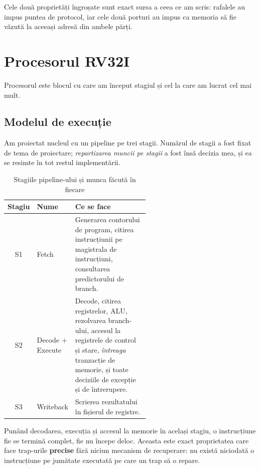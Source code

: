 \documentclass[11pt,openany]{report}
\begin{document}
Cele două proprietăți îngroșate sunt exact sursa a ceea ce am scris: rafalele au
impus puntea de protocol, iar cele două porturi au impus ca memoria să fie văzută
la aceeași adresă din ambele părți.

\chapter{Procesorul RV32I}
\label{ch:cpu}

Procesorul este blocul cu care am început stagiul și cel la care am lucrat cel
mai mult.

\section{Modelul de execuție}

Am proiectat nucleul cu un pipeline pe trei stagii. Numărul de stagii a fost
fixat de tema de proiectare; \emph{repartizarea muncii pe stagii} a fost însă
decizia mea, și ea se resimte în tot restul implementării.

\begin{table}[H]
\centering
\caption{Stagiile pipeline-ului și munca făcută în fiecare}
\label{tab:stagii}
\small
\begin{tabular}{@{}clL{0.56\linewidth}@{}}
\toprule
\textbf{Stagiu} & \textbf{Nume} & \textbf{Ce se face} \\
\midrule
S1 & Fetch &
  Generarea contorului de program, citirea instrucțiunii pe magistrala de
  instrucțiuni, consultarea predictorului de branch. \\
S2 & Decode $+$ Execute &
  Decode, citirea registrelor, ALU, rezolvarea branch-ului, accesul la registrele
  de control și stare, \emph{întreaga} tranzacție de memorie, și toate deciziile
  de excepție și de întrerupere. \\
S3 & Writeback &
  Scrierea rezultatului în fișierul de registre. \\
\bottomrule
\end{tabular}
\end{table}

Punând decodarea, execuția și accesul la memorie în același stagiu, o
instrucțiune fie se termină complet, fie nu începe deloc. Aceasta este exact
proprietatea care face trap-urile \textbf{precise} fără niciun mecanism de
recuperare: nu există niciodată o instrucțiune pe jumătate executată pe care un
trap să o repare.
\end{document}
